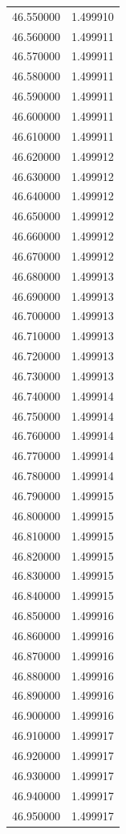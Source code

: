 \begin{tabular}{rr}
46.550000 & 1.499910 \\
46.560000 & 1.499911 \\
46.570000 & 1.499911 \\
46.580000 & 1.499911 \\
46.590000 & 1.499911 \\
46.600000 & 1.499911 \\
46.610000 & 1.499911 \\
46.620000 & 1.499912 \\
46.630000 & 1.499912 \\
46.640000 & 1.499912 \\
46.650000 & 1.499912 \\
46.660000 & 1.499912 \\
46.670000 & 1.499912 \\
46.680000 & 1.499913 \\
46.690000 & 1.499913 \\
46.700000 & 1.499913 \\
46.710000 & 1.499913 \\
46.720000 & 1.499913 \\
46.730000 & 1.499913 \\
46.740000 & 1.499914 \\
46.750000 & 1.499914 \\
46.760000 & 1.499914 \\
46.770000 & 1.499914 \\
46.780000 & 1.499914 \\
46.790000 & 1.499915 \\
46.800000 & 1.499915 \\
46.810000 & 1.499915 \\
46.820000 & 1.499915 \\
46.830000 & 1.499915 \\
46.840000 & 1.499915 \\
46.850000 & 1.499916 \\
46.860000 & 1.499916 \\
46.870000 & 1.499916 \\
46.880000 & 1.499916 \\
46.890000 & 1.499916 \\
46.900000 & 1.499916 \\
46.910000 & 1.499917 \\
46.920000 & 1.499917 \\
46.930000 & 1.499917 \\
46.940000 & 1.499917 \\
46.950000 & 1.499917 \\

\end{tabular}
